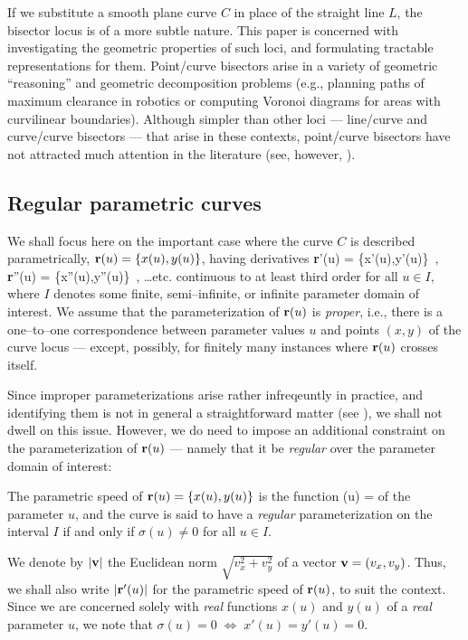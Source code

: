 If we substitute a smooth plane curve $C$ in place of
the straight line $L$, the bisector locus is of a more
subtle nature. This paper is concerned with investigating
the geometric properties of such loci, and formulating
tractable representations for them. Point/curve bisectors
arise in a variety of geometric ``reasoning'' and geometric
decomposition problems (e.g., planning paths of maximum
clearance in robotics or computing Voronoi diagrams for areas
with curvilinear boundaries). Although simpler than other
loci --- line/curve and curve/curve bisectors --- that arise
in these contexts, point/curve bisectors have not attracted
much attention in the literature (see, however, \cite
{yap87,yap89}).

\subsection{Regular parametric curves}

We shall focus here on the important case where the curve $C$
is described parametrically, ${\bf r}(u)=\{x(u),y(u)\}$, having
derivatives
\be \label{derivs}
{\bf r}'(u) = \{x'(u),y'(u)\} \,, \quad
{\bf r}''(u) = \{x''(u),y''(u)\} \,, \quad
\ldots {\rm etc.}
\ee
continuous to at least third order for all $u \in I$, where $I$
denotes some finite, semi--infinite, or infinite parameter domain
of interest. We assume that the parameterization of ${\bf r}(u)$
is {\it proper}, i.e., there is a one--to--one correspondence
between parameter values $u$ and points $(x,y)$ of the curve
locus --- except, possibly, for finitely many instances where
${\bf r}(u)$ crosses itself.

Since improper parameterizations arise rather infreqeuntly in
practice, and identifying them is not in general a straightforward
matter (see \cite{sederberg84,sederberg86}), we shall not dwell on
this issue. However, we do need to impose an additional constraint
on the parameterization of ${\bf r}(u)$ --- namely that it be {\it
regular\/} over the parameter domain of interest:

\begin{dfn}
The parametric speed of ${\bf r}(u)=\{x(u),y(u)\}$ is the
function
\be \label{sigma}
\sigma(u) = 
\ee
of the parameter $u$, and the curve is said to have a {\it
regular\/} parameterization on the interval $I$ if and only if
$\sigma(u)\not=0$ for all $u \in I$.
\end{dfn}

We denote by $|{\bf v}|$ the Euclidean norm $\sqrt{v_x^2+
v_y^2}$ of a vector ${\bf v}=(v_x,v_y)$. Thus, we shall also
write $|{\bf r}'(u)|$ for the parametric speed of ${\bf r}(u)$,
to suit the context. Since we are concerned solely with {\it
real\/} functions $x(u)$ and $y(u)$ of a {\it real\/} parameter
$u$, we note that $\sigma(u)=0\;\Longleftrightarrow\;x'(u)=
y'(u)=0$.

